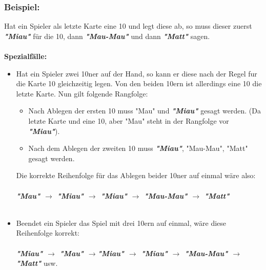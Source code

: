 \documentclass{article}
\begin{document}
\subsubsection*{Beispiel:}
Hat ein Spieler als letzte Karte eine 10 und legt diese ab, so muss dieser zuerst \textit{\textbf{"Miau"}} für die 10, dann \textbf{\textit{"Mau-Mau"}} und dann \textit{\textbf{"Matt"}} sagen. \\ \\
\textbf{Spezialfälle:}
\begin{itemize}
\item Hat ein Spieler zwei 10ner auf der Hand, so kann er diese nach der Regel fur die Karte 10 gleichzeitig legen. Von den beiden 10ern ist allerdings eine 10 die letzte Karte. Nun gilt folgende Rangfolge: \\
\begin{itemize}
\item Nach Ablegen der ersten 10 muss "Mau" und \textit{\textbf{"Miau"}} gesagt werden. (Da letzte Karte und eine 10, aber "Mau" steht in der Rangfolge vor \textit{\textbf{"Miau"}}).
\item Nach dem Ablegen der zweiten 10 muss \textit{\textbf{"Miau"}}, "Mau-Mau", "Matt" gesagt werden.
\end{itemize}
Die korrekte Reihenfolge für das Ablegen beider 10ner auf einmal wäre also: \\ \\
\textit{\textbf{"Mau" $\rightarrow$ "Miau" $\rightarrow$ "Miau" $\rightarrow$ "Mau-Mau" $\rightarrow$ "Matt"}} \\ \\
        
\item Beendet ein Spieler das Spiel mit drei 10ern auf einmal, wäre diese Reihenfolge korrekt: \\ \\  
       \textit{\textbf{"Miau" $\rightarrow$ "Mau" $\rightarrow$"Miau" $\rightarrow$ "Miau" $\rightarrow$ "Mau-Mau" $\rightarrow$ "Matt"}} usw.
\end{itemize}
\end{document}
